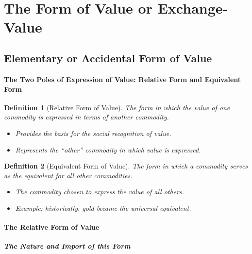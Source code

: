 \documentclass{article}
\newtheorem{innerdef}{Definition}
\newenvironment{definition}{\begin{innerdef}}{\end{innerdef}}
\begin{document}
\newpage

\section{The Form of Value or Exchange-Value}

\subsection{Elementary or Accidental Form of Value}

\paragraph{The Two Poles of Expression of Value: Relative Form and Equivalent Form}

\begin{definition}[Relative Form of Value]
The form in which the value of one commodity is expressed in terms of another commodity.
\begin{itemize}[noitemsep]
    \item Provides the basis for the social recognition of value.
    \item Represents the “other” commodity in which value is expressed.
\end{itemize}
\end{definition}

\begin{definition}[Equivalent Form of Value]
The form in which a commodity serves as the equivalent for all other commodities.
\begin{itemize}[noitemsep]
    \item The commodity chosen to express the value of all others.
    \item Example: historically, gold became the universal equivalent.
\end{itemize}
\end{definition}


\paragraph{The Relative Form of Value} %

\subparagraph{The Nature and Import of this Form} %
\end{document}
